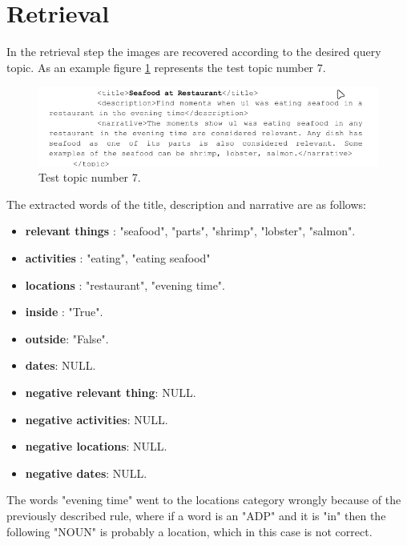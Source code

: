 \section{Retrieval}

    In the retrieval step the images are recovered according to the desired query topic.
    As an example figure \ref{fig:testtopic} represents the test topic number 7.
   
    \begin{figure}[H]
        \centering
        \captionsetup{justification=centering}
        \includegraphics[width = \textwidth]{Sections/6textprocessing/images/topic.png}
        \caption{Test topic number 7.}
        \label{fig:testtopic}
      \end{figure}
      
      The extracted words of the title, description and narrative are as follows:

      \begin{itemize}
        \item \textbf{relevant things} : 
            "seafood",
            "parts",
            "shrimp",
            "lobster",
            "salmon".
        \item \textbf{activities} : "eating",
        "eating seafood"
        \item \textbf{locations} : "restaurant",  "evening time".
        \item \textbf{inside} : "True".
        \item \textbf{outside}: "False".
        \item \textbf{dates}: NULL.
        \item \textbf{negative relevant thing}: NULL.
        \item \textbf{negative activities}: NULL.
        \item \textbf{negative locations}:  NULL.
        \item \textbf{negative dates}: NULL.
       
    \end{itemize}

    The words "evening time" went to the locations category wrongly because of the previously described rule, where if a word is an "ADP" and it is "in" then the following "NOUN" is probably a location, which in this case is not correct.


